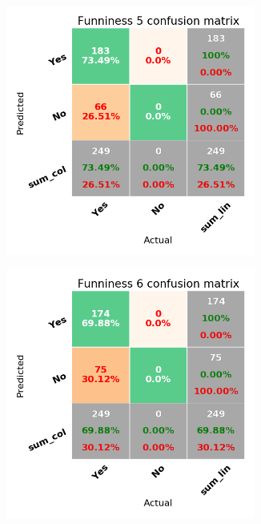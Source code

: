 \documentclass[draft,final,oneside]{vutinfth} %
\begin{document}
\begin{figure}
\begin{subfigure}[b]{0.45\textwidth}
\centering
\includegraphics[width=0.9\textwidth,height=0.3\textheight,keepaspectratio]{graphics/twostageperf/funniness5}
\end{subfigure}\quad
\begin{subfigure}[b]{0.45\textwidth}
\centering
\includegraphics[width=0.9\textwidth,height=0.3\textheight,keepaspectratio]{graphics/twostageperf/funniness6}
\end{subfigure}



\end{figure}
\end{document}
